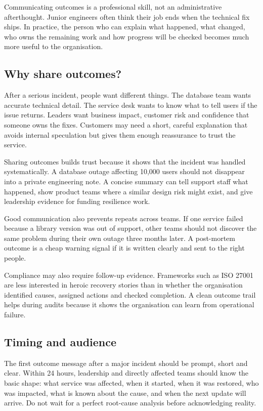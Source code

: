 Communicating outcomes is a professional skill, not an administrative afterthought. Junior engineers often think their job ends when the technical fix ships. In practice, the person who can explain what happened, what changed, who owns the remaining work and how progress will be checked becomes much more useful to the organisation.



\subsection{Why share outcomes?}


After a serious incident, people want different things. The database team wants accurate technical detail. The service desk wants to know what to tell users if the issue returns. Leaders want business impact, customer risk and confidence that someone owns the fixes. Customers may need a short, careful explanation that avoids internal speculation but gives them enough reassurance to trust the service.


Sharing outcomes builds trust because it shows that the incident was handled systematically. A database outage affecting 10,000 users should not disappear into a private engineering note. A concise summary can tell support staff what happened, show product teams where a similar design risk might exist, and give leadership evidence for funding resilience work.


Good communication also prevents repeats across teams. If one service failed because a library version was out of support, other teams should not discover the same problem during their own outage three months later. A post-mortem outcome is a cheap warning signal if it is written clearly and sent to the right people.


Compliance may also require follow-up evidence. Frameworks such as ISO 27001 are less interested in heroic recovery stories than in whether the organisation identified causes, assigned actions and checked completion. A clean outcome trail helps during audits because it shows the organisation can learn from operational failure.



\subsection{Timing and audience}


The first outcome message after a major incident should be prompt, short and clear. Within 24 hours, leadership and directly affected teams should know the basic shape: what service was affected, when it started, when it was restored, who was impacted, what is known about the cause, and when the next update will arrive. Do not wait for a perfect root-cause analysis before acknowledging reality.


